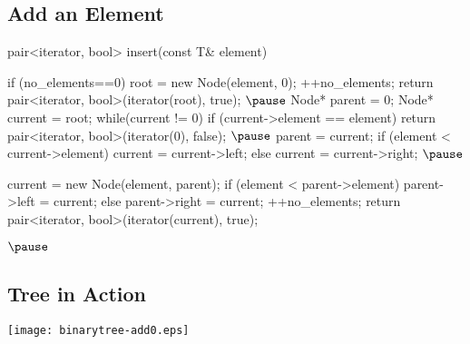 
\begin{slide}
\section{Add an Element}

\begin{cpp}
  pair<iterator, bool> insert(const T& element) {
    if (no_elements==0) {
      root = new Node(element, 0);
      ++no_elements;
      return pair<iterator, bool>(iterator(root), true);
    }$\pause$
    Node* parent = 0;
    Node* current = root;
    while(current != 0) {
      if (current->element == element) {
	return pair<iterator, bool>(iterator(0), false);
      }$\pause$
      parent = current;
      if (element < current->element) {
	current = current->left;
      } else {
	current = current->right;
      }
    }$\pause$

    




    
    current = new Node(element, parent);
    if (element < parent->element) {
      parent->left = current;
    } else {
      parent->right = current;
    }
    ++no_elements;
    return pair<iterator, bool>(iterator(current), true);
  }$\pause$
\end{cpp}
\end{slide}


\begin{slide}
\section[-1]{Tree in Action}
\pb\pause
\begin{center}
  \texttt{[image: binarytree-add0.eps]}
\end{center}
\end{slide}




